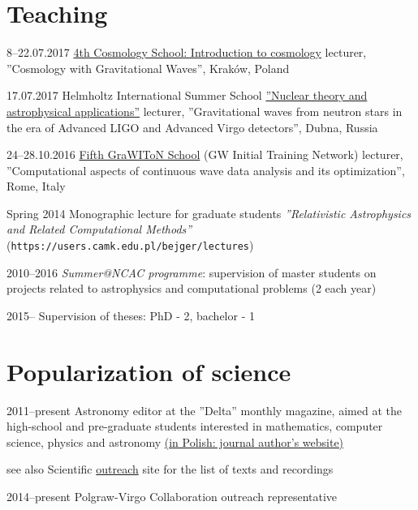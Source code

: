 \documentclass[]{friggeri-cv} %
\begin{document}
\pagebreak 
{} %

\pagebreak
\section{Teaching}
\begin{entrylistshort}

\entrys
{8--22.07.2017}
{\href{http://cosmoschool2018.oa.uj.edu.pl}{4th Cosmology School: Introduction to cosmology} lecturer, ''Cosmology with Gravitational Waves'', Kraków, Poland}

\entrys
{17.07.2017} 
{Helmholtz International Summer School \href{http://theor.jinr.ru/~ntaa/17}{''Nuclear theory and astrophysical applications''} lecturer, ''Gravitational waves from neutron stars in the era of Advanced LIGO and Advanced Virgo detectors'', Dubna, Russia}  

\entrys
{24--28.10.2016}
{\href{https://events.ego-gw.it/indico/conferenceDisplay.py?ovw=True\&confId=44}{Fifth GraWIToN School} (GW Initial Training Network) lecturer, ''Computational aspects of continuous wave data analysis and its optimization'', Rome, Italy}

\entrys
{Spring 2014}
{Monographic lecture for graduate students {\it ''Relativistic Astrophysics and Related Computational Methods''} ({\tt https://users.camk.edu.pl/bejger/lectures})} 

\entrys
{2010--2016} 
{{\it Summer@NCAC programme}: supervision of master students on projects related to astrophysics and computational problems (2 each year)} 

\entrys
{2015--} 
{Supervision of theses: PhD - 2, bachelor - 1} 
\end{entrylistshort}



\section{Popularization of science}
\begin{entrylistshort}

\entrys 
{2011--present} 
{Astronomy editor at the ''Delta'' monthly magazine, aimed at the high-school and pre-graduate students interested in mathematics, computer science, physics and astronomy \href{http://www.deltami.edu.pl/delta/autorzy/michal\_bejger}{(in Polish: journal author's website)}} 

\entrys
{see also} 
{Scientific \href{http://users.camk.edu.pl/bejger/outreach/}{outreach} site for the list of texts and recordings} 

\entrys
{2014--present} 
{Polgraw-Virgo Collaboration outreach representative} 
\end{entrylistshort}
\end{document}
